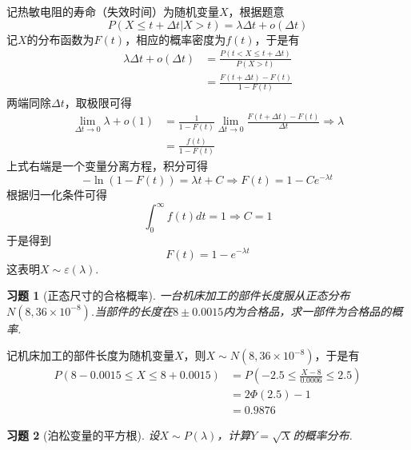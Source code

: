 \documentclass[UTF8,12pt,a4paper,fontset=fandol]{ctexart}
\newtheorem{exercise}{习题}[section]
\begin{document}
\begin{solve}\label{a:Y3.14}
记热敏电阻的寿命（失效时间）为随机变量$X$，根据题意
\[P(X \leqslant t + \Delta t|X > t) = \lambda \Delta t + o(\Delta t)\]
记$X$的分布函数为$F(t)$，相应的概率密度为$f(t)$，于是有
\[\begin{aligned}\lambda \Delta t + o(\Delta t) &= \frac{{P(t < X \leqslant t + \Delta t)}}{{P(X > t)}} \\&= \frac{{F(t + \Delta t) - F(t)}}{{1 - F(t)}}\end{aligned}\]
两端同除$\Delta t$，取极限可得
\[\begin{aligned}\mathop {\lim }\limits_{\Delta t \to 0} \lambda  + o(1) &= \frac{1}{{1 - F(t)}}\mathop {\lim }\limits_{\Delta t \to 0} \frac{{F(t + \Delta t) - F(t)}}{{\Delta t}} \Rightarrow \lambda  \\&= \frac{{f(t)}}{{1 - F(t)}}\end{aligned}\]
上式右端是一个变量分离方程，积分可得
\[ - \ln (1 - F(t)) = \lambda t + C \Rightarrow F(t) = 1 - C{e^{ - \lambda t}}\]
根据归一化条件可得
\[\int_0^\infty  {f(t)dt}  = 1 \Rightarrow C = 1\]
于是得到
\[F(t) = 1 - {e^{ - \lambda t}}\]
这表明$X\sim \varepsilon(\lambda)$.
\end{solve}

\begin{exercise}[正态尺寸的合格概率]\label{q:Y3.15}
一台机床加工的部件长度服从正态分布$N(8,36\times 10^{-8})$.当部件的长度在$8\pm 0.0015$内为合格品，求一部件为合格品的概率.\par{}
\end{exercise}

\begin{solve}\label{a:Y3.15}
记机床加工的部件长度为随机变量$X$，则$X\sim N(8,36\times 10^{-8})$，于是有
\[\begin{aligned}P(8 - 0.0015 \leqslant X \leqslant 8 + 0.0015) &= P( - 2.5 \leqslant \frac{{X - 8}}{{0.0006}} \leqslant 2.5) \\&= 2\Phi (2.5) - 1 \\&= 0.9876\end{aligned}\]
\end{solve}

\begin{exercise}[泊松变量的平方根]\label{q:Y3.16}
设$X\sim P(\lambda)$，计算$Y=\sqrt{X}$的概率分布.\par{}
\end{exercise}
\end{document}
